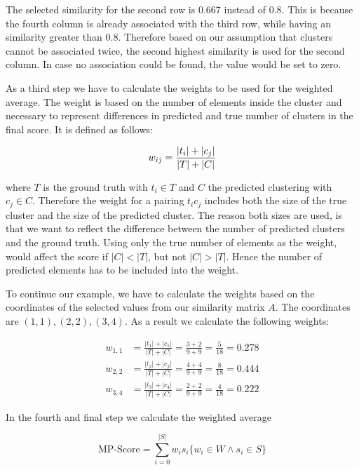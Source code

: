 The selected similarity for the second row is 0.667 instead of 0.8.
This is because the fourth column is already associated with the third row, while having an similarity greater than 0.8.
Therefore based on our assumption that clusters cannot be associated twice,
the second highest similarity is used for the second column.
In case no association could be found, the value would be set to zero.

As a third step we have to calculate the weights to be used for the weighted average.
The weight is based on the number of elements inside the cluster
and necessary to represent differences in predicted and true number of clusters in the final score.
It is defined as follows:

\begin{equation}
    \label{equ:weight}
        w_{ij} = \frac{|t_i| + |c_j|}{|T|+|C|} \\
\end{equation}

where $T$ is the ground truth with $t_i \in T$ and $C$ the predicted clustering with  $c_j \in C$.
Therefore the weight for a pairing $t_ic_j$ includes both the size of the true cluster
and the size of the predicted cluster.
The reason both sizes are used,
is that we want to reflect the difference between the number of predicted clusters and the ground truth.
Using only the true number of elements as the weight, would affect the score if $|C| < |T|$, but not $|C| > |T|$.
Hence the number of predicted elements has to be included into the weight.

To continue our example,
we have to calculate the weights based on the coordinates of the selected values from our similarity matrix $A$.
The coordinates are $(1,1), (2,2), (3,4)$.
As a result we calculate the following weights:

\begin{align*}
    w_{1,1} &= \frac{|t_1| + |c_1|}{|T|+|C|} = \frac{3 + 2}{9 + 9} = \frac{5}{18} = 0.278 \\
    w_{2,2} &= \frac{|t_2| + |c_2|}{|T|+|C|} = \frac{4 + 4}{9 + 9} = \frac{8}{18} = 0.444 \\
    w_{3,4} &= \frac{|t_3| + |c_4|}{|T|+|C|} = \frac{2 + 2}{9 + 9} = \frac{4}{18} = 0.222
\end{align*}

In the fourth and final step we calculate the weighted average

\begin{equation}
    \label{equ:weighted_average}
        \text{MP-Score} = \sum_{i=0}^{|S|} w_is_i \{w_i \in W \wedge s_i \in S\}
\end{equation}

